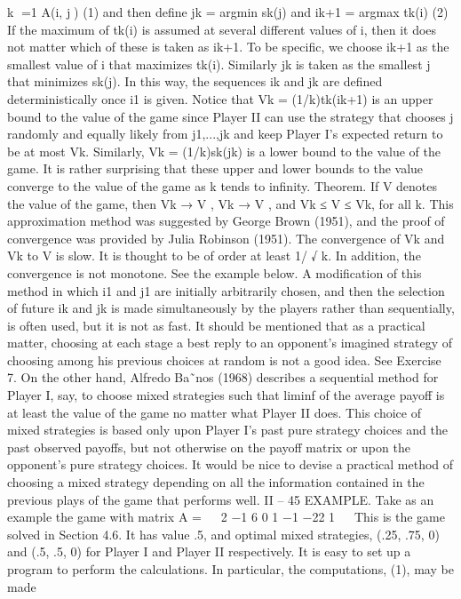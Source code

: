 k
=1
A(i, j) (1)
and then define
jk = argmin sk(j) and ik+1 = argmax tk(i) (2)
If the maximum of tk(i) is assumed at several different values of i, then it does not matter
which of these is taken as ik+1. To be specific, we choose ik+1 as the smallest value of i
that maximizes tk(i). Similarly jk is taken as the smallest j that minimizes sk(j). In this
way, the sequences ik and jk are defined deterministically once i1 is given.
Notice that Vk = (1/k)tk(ik+1) is an upper bound to the value of the game since
Player II can use the strategy that chooses j randomly and equally likely from j1,...,jk
and keep Player I’s expected return to be at most Vk. Similarly, Vk = (1/k)sk(jk) is a
lower bound to the value of the game. It is rather surprising that these upper and lower
bounds to the value converge to the value of the game as k tends to infinity.
Theorem. If V denotes the value of the game, then Vk → V , Vk → V , and Vk ≤ V ≤ Vk,
for all k.
This approximation method was suggested by George Brown (1951), and the proof
of convergence was provided by Julia Robinson (1951). The convergence of Vk and Vk to
V is slow. It is thought to be of order at least 1/
√
k. In addition, the convergence is not
monotone. See the example below.
A modification of this method in which i1 and j1 are initially arbitrarily chosen, and
then the selection of future ik and jk is made simultaneously by the players rather than
sequentially, is often used, but it is not as fast.
It should be mentioned that as a practical matter, choosing at each stage a best reply
to an opponent’s imagined strategy of choosing among his previous choices at random is
not a good idea. See Exercise 7. On the other hand, Alfredo Ba˜nos (1968) describes a
sequential method for Player I, say, to choose mixed strategies such that liminf of the
average payoff is at least the value of the game no matter what Player II does. This
choice of mixed strategies is based only upon Player I’s past pure strategy choices and
the past observed payoffs, but not otherwise on the payoff matrix or upon the opponent’s
pure strategy choices. It would be nice to devise a practical method of choosing a mixed
strategy depending on all the information contained in the previous plays of the game that
performs well.
II – 45
EXAMPLE. Take as an example the game with matrix
A =
⎛
⎝
2 −1 6
0 1 −1
−22 1
⎞
⎠
This is the game solved in Section 4.6. It has value .5, and optimal mixed strategies,
(.25, .75, 0) and (.5, .5, 0) for Player I and Player II respectively. It is easy to set up a
program to perform the calculations. In particular, the computations, (1), may be made
